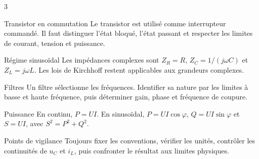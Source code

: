 \documentclass[a3paper,landscape,10pt]{article}
\begin{document}
\begin{multicols}{3}
\begin{TLPosterBloc}{Transistor en commutation}
Le transistor est utilisé comme interrupteur commandé. Il faut distinguer l'état bloqué, l'état passant et respecter les limites de courant, tension et puissance.
\end{TLPosterBloc}

\begin{TLPosterBloc}{Régime sinusoïdal}
Les impédances complexes sont $Z_R=R$, $Z_C=1/(j\omega C)$ et $Z_L=j\omega L$. Les lois de Kirchhoff restent applicables aux grandeurs complexes.
\end{TLPosterBloc}

\begin{TLPosterBloc}{Filtres}
Un filtre sélectionne les fréquences. Identifier sa nature par les limites à basse et haute fréquence, puis déterminer gain, phase et fréquence de coupure.
\end{TLPosterBloc}

\begin{TLPosterBloc}{Puissance}
En continu, $P=UI$. En sinusoïdal, $P=UI\cos\varphi$, $Q=UI\sin\varphi$ et $S=UI$, avec $S^2=P^2+Q^2$.
\end{TLPosterBloc}

\begin{TLPosterBloc}{Points de vigilance}
Toujours fixer les conventions, vérifier les unités, contrôler les continuités de $u_C$ et $i_L$, puis confronter le résultat aux limites physiques.
\end{TLPosterBloc}

\end{multicols}
\end{document}

